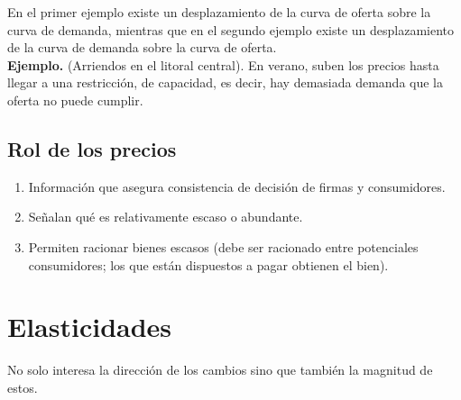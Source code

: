 \documentclass{report}
\newenvironment{example}[1]{\noindent\setlength{\parskip}{0pt}\textbf{Ejemplo.} (#1).}{}
\begin{document}
En el primer ejemplo existe un desplazamiento de la curva de oferta sobre la curva de demanda, mientras que en el segundo ejemplo existe un desplazamiento de la curva de demanda sobre la curva de oferta.\\

\begin{example}{Arriendos en el litoral central}
En verano, suben los precios hasta llegar a una restricción, de capacidad, es decir, hay demasiada demanda que la oferta no puede cumplir.
\begin{center}
\end{center}
\end{example}

\subsection{Rol de los precios}

\begin{enumerate}
\item Información que asegura consistencia de decisión de firmas y consumidores.
\item Señalan qué es relativamente escaso o abundante.
\item Permiten racionar bienes escasos (debe ser racionado entre potenciales consumidores; los que están dispuestos a pagar obtienen el bien).
\end{enumerate}

\section{Elasticidades}

No solo interesa la dirección de los cambios sino que también la magnitud de estos.
\end{document}
